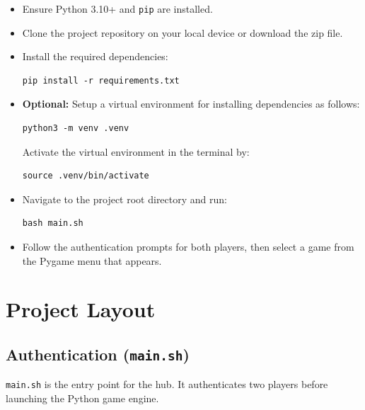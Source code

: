 \documentclass[12pt, letterpaper]{article}
\begin{document}
\begin{itemize}
    \item Ensure Python 3.10+ and \texttt{pip} are installed.
    \item Clone the project repository on your local device or download the zip file.
    \item Install the required dependencies:
\begin{lstlisting}[style=bashstyle]
pip install -r requirements.txt
\end{lstlisting}
    \item \textbf{Optional:} Setup a virtual environment for installing dependencies as follows:
    \begin{lstlisting}[style=bashstyle]
        python3 -m venv .venv
    \end{lstlisting}
    Activate the virtual environment in the terminal by:
    \begin{lstlisting}[style=bashstyle]
        source .venv/bin/activate
    \end{lstlisting}
    \item Navigate to the project root directory and run:
\begin{lstlisting}[style=bashstyle]
bash main.sh
\end{lstlisting}
    \item Follow the authentication prompts for both players, then select a
          game from the Pygame menu that appears.
    
\end{itemize}

\section{Project Layout}

\subsection{Authentication (\texttt{main.sh})}

\texttt{main.sh} is the entry point for the hub. It authenticates two players
before launching the Python game engine.
\end{document}
